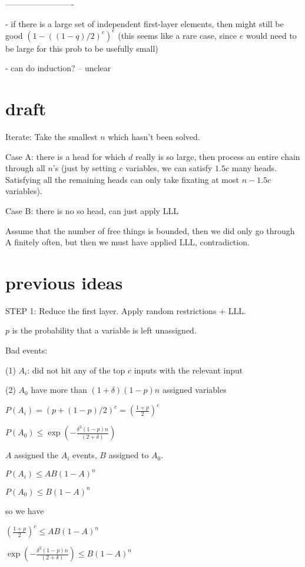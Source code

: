 \documentclass[11pt,a4paper]{article}
\begin{document}
-------------------------

- if there is a large set of independent first-layer elements, then might still be good $(1-((1-q)/2)^{c})^{e}$ (this seems like a rare case, since $e$ would need to be large for this prob to be usefully small)

- can do induction? -- unclear


\section{draft}

Iterate:
Take the smallest $n$ which hasn't been solved.

Case A: there is a head for which $d$ really is so large, then process an entire chain through all $n$'s (just by setting $c$ variables, we can satisfy $1.5 c$ many heads. Satisfying all the remaining heads can only take fixating at most $n-1.5c$ variables).

Case B: there is no so head, can just apply LLL

Assume that the number of free things is bounded, then we did only go through A finitely often, but then we must have applied LLL, contradiction.


\section{previous ideas}

STEP 1: Reduce the first layer. Apply random restrictions + LLL.

$p$ is the probability that a variable is left unassigned.

Bad events:

(1) $A_i$: did not hit any of the top $c$ inputs with the relevant input

(2) $A_0$ have more than $(1+\delta)(1-p)n$ assigned variables

$P(A_i) = (p+(1-p)/2)^c = \left(\frac{1+p}{2}\right)^c$

$P(A_0) \leq \exp(-\frac{\delta^2(1-p)n}{(2+\delta)})$

$A$ assigned the $A_i$ events, $B$ assigned to $A_0$.


$P(A_i) \leq A B (1-A)^n$

$P(A_0) \leq B (1-A)^n$

so we have

$\left(\frac{1+p}{2}\right)^c \leq A B (1-A)^n$

$ \exp(-\frac{\delta^2(1-p)n}{(2+\delta)})  \leq B (1-A)^n$
\end{document}
